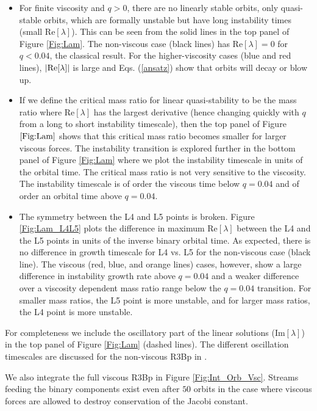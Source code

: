 \begin{itemize}
\item For finite viscosity and $q>0$, there are no linearly stable
  orbits, only quasi-stable orbits, which are formally unstable but
  have long instability times (small Re$[\lambda]$). This can be
  seen from the solid lines in the top panel of Figure
  \ref{Fig:Lam}. The non-viscous case (black lines) has Re$[\lambda]
  =0$ for $q<0.04$, the classical result. For the higher-viscosity
  cases (blue and red lines), $|\rm{Re}[\lambda]|$ is large and
  Eqs. (\ref{ansatz}) show that orbits will decay or blow up.
\item If we define the critical mass ratio for linear quasi-stability
  to be the mass ratio where Re$[\lambda]$ has the largest derivative
  (hence changing quickly with $q$ from a long to short instability
  timescale), then the top panel of Figure $\ref{Fig:Lam}$ shows that
  this critical mass ratio becomes smaller for larger viscous
  forces. The instability transition is explored further in the bottom
  panel of Figure \ref{Fig:Lam} where we plot the instability
  timescale in units of the orbital time. The critical mass ratio is
  not very sensitive to the viscosity. The instability timescale is of
  order the viscous time below $q=0.04$ and of order an orbital time
  above $q=0.04$.
\item The symmetry between the L4 and L5 points is broken. Figure
  \ref{Fig:Lam_L4L5} plots the difference in maximum Re$[\lambda]$ between
  the L4 and the L5 points in units of the inverse binary orbital time. As expected, there
  is no difference in growth timescale for L4 vs. L5 for the
  non-viscous case (black line). The viscous (red, blue, and orange
  lines) cases, however, show a large difference in instability growth
  rate above $q=0.04$ and a weaker difference over a viscosity
  dependent mass ratio range below the $q=0.04$ transition. For
  smaller mass ratios, the L5 point is more unstable, and for larger
  mass ratios, the L4 point is more unstable. 
\end{itemize}

For completeness we include the oscillatory part of the linear
solutions (Im$[\lambda]$) in the top panel of Figure \ref{Fig:Lam}
(dashed lines). The different oscillation timescales are discussed for
the non-viscous R3Bp in \citep{Murray:1994}.

We also integrate the full viscous R3Bp in Figure
\ref{Fig:Int_Orb_Vsc}. Streams feeding the binary components exist
even after $50$ orbits in the case where viscous forces are allowed
to destroy conservation of the Jacobi constant.



